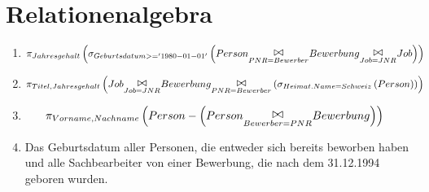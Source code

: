 \documentclass[ngerman]{gdb-aufgabenblatt}
\begin{document}
\section{Relationenalgebra}
\begin{enumerate}
\item
\begin{align*}
&\projektion{Jahresgehalt}\left( \selektion{Geburtsdatum >= '1980-01-01'}\left(Person \verbund{PNR=Bewerber} Bewerbung \verbund{Job=JNR} Job\right)\right)
\end{align*}
\item
\begin{align*}
&\projektion{Titel, Jahresgehalt}\left(Job \verbund{Job=JNR} Bewerbung \verbund{PNR=Bewerber} \left(\selektion{Heimat.Name = Schweiz}\left(Person\right)\right) \right)
\end{align*}
\item
\begin{align*}
&\projektion{Vorname, Nachname}\left( Person - \left( Person \verbund{Bewerber = PNR} Bewerbung \right) \right)
\end{align*}
\item
Das Geburtsdatum aller Personen, die entweder sich bereits beworben haben und alle Sachbearbeiter von einer Bewerbung, die nach dem 31.12.1994 geboren wurden.
\end{enumerate}
\end{document}
